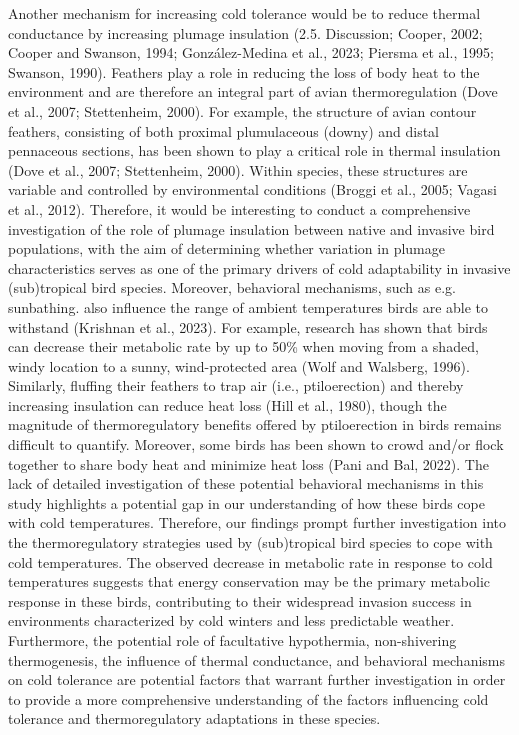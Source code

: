 \documentclass[10pt, twoside]{book} %
\begin{document}
Another mechanism for increasing cold tolerance would be to reduce thermal conductance by increasing plumage insulation (2.5. Discussion; Cooper, 2002; Cooper and Swanson, 1994; González-Medina et al., 2023; Piersma et al., 1995; Swanson, 1990). Feathers play a role in reducing the loss of body heat to the environment and are therefore an integral part of avian thermoregulation (Dove et al., 2007; Stettenheim, 2000). For example, the structure of avian contour feathers, consisting of both proximal plumulaceous (downy) and distal pennaceous sections, has been shown to play a critical role in thermal insulation (Dove et al., 2007; Stettenheim, 2000). Within species, these structures are variable and controlled by environmental conditions (Broggi et al., 2005; Vagasi et al., 2012). Therefore, it would be interesting to conduct a comprehensive investigation of the role of plumage insulation between native and invasive bird populations, with the aim of determining whether variation in plumage characteristics serves as one of the primary drivers of cold adaptability in invasive (sub)tropical bird species. Moreover, behavioral mechanisms, such as e.g. sunbathing. also influence the range of ambient temperatures birds are able to withstand (Krishnan et al., 2023). For example, research has shown that birds can decrease their metabolic rate by up to 50\% when moving from a shaded, windy location to a sunny, wind-protected area (Wolf and Walsberg, 1996). Similarly, fluffing their feathers to trap air (i.e., ptiloerection) and thereby increasing insulation can reduce heat loss (Hill et al., 1980), though the magnitude of thermoregulatory benefits offered by ptiloerection in birds remains difficult to quantify. Moreover, some birds has been shown to crowd and/or flock together to share body heat and minimize heat loss (Pani and Bal, 2022). The lack of detailed investigation of these potential behavioral mechanisms in this study highlights a potential gap in our understanding of how these birds cope with cold temperatures.  Therefore, our findings prompt further investigation into the thermoregulatory strategies used by (sub)tropical bird species to cope with cold temperatures. The observed decrease in metabolic rate in response to cold temperatures suggests that energy conservation may be the primary metabolic response in these birds, contributing to their widespread invasion success in environments characterized by cold winters and less predictable weather. Furthermore, the potential role of facultative hypothermia, non-shivering thermogenesis, the influence of thermal conductance, and behavioral mechanisms on cold tolerance are potential factors that warrant further investigation in order to provide a more comprehensive understanding of the factors influencing cold tolerance and thermoregulatory adaptations in these species.\\
\end{document}
